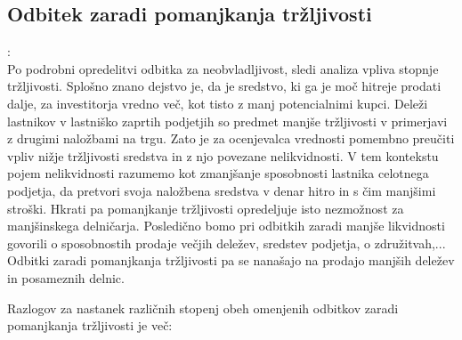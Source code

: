 \documentclass[12pt,a4paper]{amsart}
\theoremstyle{definition} %
\theoremstyle{plain} %
\begin{document}
\subsection{Odbitek zaradi pomanjkanja tržljivosti}:\\
Po podrobni opredelitvi odbitka za neobvladljivost, sledi analiza vpliva stopnje tržljivosti. Splošno znano dejstvo je, da je sredstvo, ki ga je moč hitreje prodati dalje, za investitorja vredno več, kot tisto z manj potencialnimi kupci. Deleži lastnikov v lastniško zaprtih podjetjih so predmet manjše tržljivosti v primerjavi z drugimi naložbami na trgu. Zato je za ocenjevalca vrednosti pomembno preučiti vpliv nižje tržljivosti sredstva in z njo povezane nelikvidnosti. V tem kontekstu pojem nelikvidnosti razumemo kot zmanjšanje sposobnosti lastnika celotnega podjetja, da pretvori svoja naložbena sredstva v denar hitro in s čim manjšimi stroški. Hkrati pa pomanjkanje tržljivosti opredeljuje isto nezmožnost za manjšinskega delničarja. Posledično bomo pri odbitkih zaradi manjše likvidnosti govorili o sposobnostih prodaje večjih deležev, sredstev podjetja, o združitvah,... Odbitki zaradi pomanjkanja tržljivosti pa se nanašajo na prodajo manjših deležev in posameznih delnic. \par
Razlogov za nastanek različnih stopenj obeh omenjenih odbitkov zaradi pomanjkanja tržljivosti je več:
\end{document}
